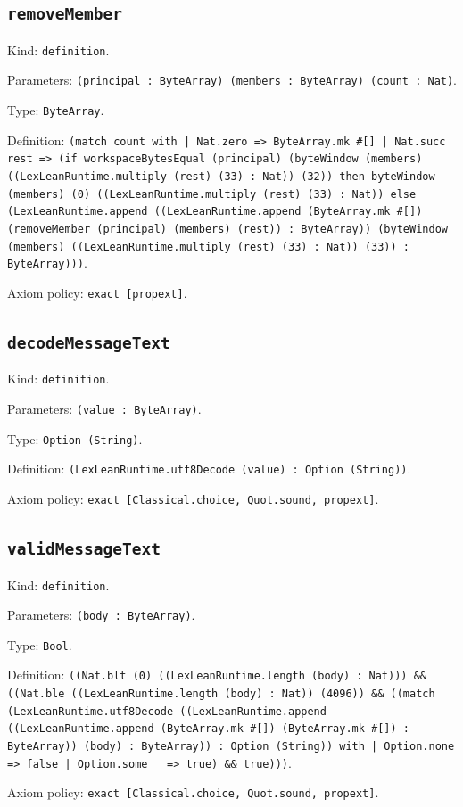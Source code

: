 \documentclass[11pt]{article}
\begin{document}
\subsection*{\texttt{removeMember}}
\noindent Kind: \texttt{definition}.\par
\noindent Parameters: \texttt{(principal : ByteArray) (members : ByteArray) (count : Nat)}.\par
\noindent Type: \texttt{ByteArray}.\par
\noindent Definition: \texttt{(match count with | Nat.zero => ByteArray.mk \#[] | Nat.succ rest => (if workspaceBytesEqual (principal) (byteWindow (members) ((LexLeanRuntime.multiply (rest) (33) : Nat)) (32)) then byteWindow (members) (0) ((LexLeanRuntime.multiply (rest) (33) : Nat)) else (LexLeanRuntime.append ((LexLeanRuntime.append (ByteArray.mk \#[]) (removeMember (principal) (members) (rest)) : ByteArray)) (byteWindow (members) ((LexLeanRuntime.multiply (rest) (33) : Nat)) (33)) : ByteArray)))}.\par
\noindent Axiom policy: \texttt{exact [propext]}.\par
\subsection*{\texttt{decodeMessageText}}
\noindent Kind: \texttt{definition}.\par
\noindent Parameters: \texttt{(value : ByteArray)}.\par
\noindent Type: \texttt{Option (String)}.\par
\noindent Definition: \texttt{(LexLeanRuntime.utf8Decode (value) : Option (String))}.\par
\noindent Axiom policy: \texttt{exact [Classical.choice, Quot.sound, propext]}.\par
\subsection*{\texttt{validMessageText}}
\noindent Kind: \texttt{definition}.\par
\noindent Parameters: \texttt{(body : ByteArray)}.\par
\noindent Type: \texttt{Bool}.\par
\noindent Definition: \texttt{((Nat.blt (0) ((LexLeanRuntime.length (body) : Nat))) \&\& ((Nat.ble ((LexLeanRuntime.length (body) : Nat)) (4096)) \&\& ((match (LexLeanRuntime.utf8Decode ((LexLeanRuntime.append ((LexLeanRuntime.append (ByteArray.mk \#[]) (ByteArray.mk \#[]) : ByteArray)) (body) : ByteArray)) : Option (String)) with | Option.none => false | Option.some \_ => true) \&\& true)))}.\par
\noindent Axiom policy: \texttt{exact [Classical.choice, Quot.sound, propext]}.\par
\end{document}
